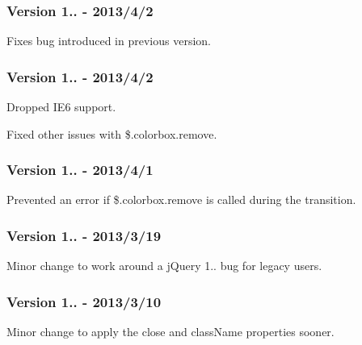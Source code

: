 \subsubsection*{Version 1.. -\/ 2013/4/2}


\begin{DoxyItemize}
\item Fixes bug introduced in previous version.
\end{DoxyItemize}

\subsubsection*{Version 1.. -\/ 2013/4/2}


\begin{DoxyItemize}
\item Dropped I\-E6 support.
\item Fixed other issues with \$.colorbox.\-remove.
\end{DoxyItemize}

\subsubsection*{Version 1.. -\/ 2013/4/1}


\begin{DoxyItemize}
\item Prevented an error if \$.colorbox.\-remove is called during the transition.
\end{DoxyItemize}

\subsubsection*{Version 1.. -\/ 2013/3/19}


\begin{DoxyItemize}
\item Minor change to work around a j\-Query 1.. bug for legacy users.
\end{DoxyItemize}

\subsubsection*{Version 1.. -\/ 2013/3/10}


\begin{DoxyItemize}
\item Minor change to apply the close and class\-Name properties sooner.
\end{DoxyItemize}

